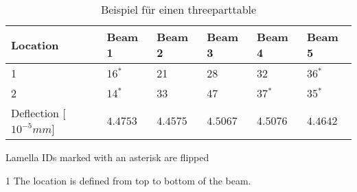 
\begin{table}[htpb]
  \centering
  \caption{Beispiel für einen threeparttable}
  \label{tab:near_optimal}
  \begin{threeparttable}
    \begin{tabular}{@{}l|lllll@{}}\toprule
      Location\tnote{1}             & Beam 1    & Beam 2    & Beam 3    & Beam 4    & Beam 5    \\ \midrule
      1                             & 16$^\ast$ & 21        & 28        & 32        & 36$^\ast$ \\
      2                             & 14$^\ast$ & 33        & 47        & 37$^\ast$ & 35$^\ast$ \\ \midrule
      Deflection [$10^{-5}\si{mm}$] & $4.4753$  & $4.4575$  & $4.5067$  & $4.5076$  & $4.4642$  \\
    \bottomrule\end{tabular}
    \begin{tablenotes}
    \item[] Lamella IDs marked with an asterisk are flipped
    \item[1] The location is defined from top to bottom of the beam.
    \end{tablenotes}
  \end{threeparttable}
\end{table}



